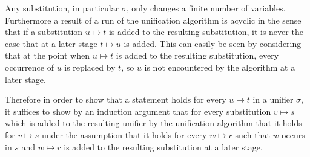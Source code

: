\documentclass[,%
	paper=a4,%
	DIV10, %
	twoside=false,%
	liststotoc,
	bibtotoc,
	draft=false,%
	numbers=noendperiod
]{scrartcl}
\begin{document}
\newcommand{\substremarksym}{$\ast$}
\newcommand{\substremarkref}{$(\ast)$}
\begin{remark}[\substremarksym]
	Any substitution, in particular $\sigma$, only changes a finite number of variables.
	Furthermore a result of a run of the unification algorithm is acyclic in the sense that if a substitution $u\mapsto t$ is added to the resulting substitution, it is never the case that at a later stage $t\mapsto u$ is added.
	This can easily be seen by considering that at the point when $u\mapsto t$ is added to the resulting substitution, every occurrence of $u$ is replaced by $t$, so $u$ is not encountered by the algorithm at a later stage.

	Therefore in order to show that a statement holds for every $u\mapsto t$ in a unifier $\sigma$, 
	it suffices to show by an induction argument that for every substitution $v\mapsto s$ which is added to the resulting unifier by the unification algorithm that it holds for $v\mapsto s$ under the assumption that it holds for every $w\mapsto r$ such that $w$ occurs in $s$ and $w\mapsto r$ is added to the resulting substitution at a later stage.
\end{remark}
\end{document}
